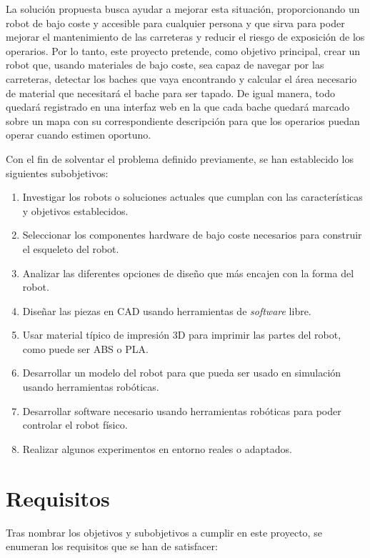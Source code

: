 La solución propuesta busca ayudar a mejorar esta situación, proporcionando un robot de bajo coste y accesible para cualquier persona y que sirva para poder mejorar el mantenimiento de las carreteras y reducir el riesgo de exposición de los operarios. Por lo tanto, este proyecto pretende, como objetivo principal, crear un robot que, usando materiales de bajo coste, sea capaz de navegar por las carreteras, detectar los baches que vaya encontrando y calcular el área necesario de material que necesitará el bache para ser tapado. De igual manera, todo quedará registrado en una interfaz web en la que cada bache quedará marcado sobre un mapa con su correspondiente descripción para que los operarios puedan operar cuando estimen oportuno.

Con el fin de solventar el problema definido previamente, se han establecido los siguientes subobjetivos:

\begin{enumerate}
	\item{} Investigar los robots o soluciones actuales que cumplan con las características y objetivos establecidos.
	\item{} Seleccionar los componentes hardware de bajo coste necesarios para construir el esqueleto del robot.
	\item{} Analizar las diferentes opciones de diseño que más encajen con la forma del robot.
	\item{} Diseñar las piezas en \acs{CAD} usando herramientas de \textit{software} libre.
	\item{} Usar material típico de impresión 3D para imprimir las partes del robot, como puede ser ABS o PLA. 
	\item{} Desarrollar un modelo del robot para que pueda ser usado en simulación usando herramientas robóticas. 
	\item{} Desarrollar software necesario usando herramientas robóticas para poder controlar el robot físico. 
	\item{} Realizar algunos experimentos en entorno reales o adaptados.  
\end{enumerate}
 

\section{Requisitos}
\label{sec:requisitos}

Tras nombrar los objetivos y subobjetivos a cumplir en este proyecto, se enumeran los requisitos que se han de satisfacer: 

